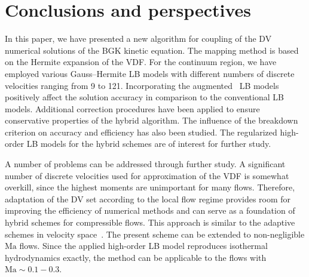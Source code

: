 \documentclass{elsarticle} %
\newcommand{\Ma}{\mathrm{Ma}}
\begin{document}
\begin{comment}%

\begin{figure}
    \centering
    \texttt{[image: \_pois\_hybr\_kn01\_cropped]}
    \caption{
        The normalized longitudinal velocity in the linear force-driven Poiseuille flow between parallel plates for $k=0.1$.
        The position of the coupling interface are shown by the vertical dashed lines.
    }\label{fig:poiseuille}
\end{figure}

In addition, the linear Poiseuille-flow problem is solved numerically.
The hybrid solution is compared with the DV and LB ones in Fig.~\ref{fig:poiseuille},
where the D2Q9-regularized LB model is employed~\cite{Latt2006, Mont2015}.
The hybrid solution based on the D2Q9-regularized model is very close to the DV results,
while the D2Q9-regularized model is failed to capture the Knudsen-layer part of the solution.
It is clearly seen from Fig.~\ref{fig:poiseuille} that the application of the regularized LB models in the hybrid scheme
can positively affect the solution accuracy in comparison to the conventional LB models.

\end{comment}

\section{Conclusions and perspectives}\label{sec:summary}

In this paper, we have presented a new algorithm for coupling of the DV numerical solutions of the BGK kinetic equation.
The mapping method is based on the Hermite expansion of the VDF.
For the continuum region, we have employed various Gauss--Hermite LB models with different numbers of discrete velocities ranging from 9 to 121.
Incorporating the augmented~\cite{Feuchter2016} LB models %
positively affect the solution accuracy in comparison to the conventional LB models.
Additional correction procedures have been applied to ensure conservative properties of the hybrid algorithm.
The influence of the breakdown criterion on accuracy and efficiency has also been studied.
The regularized high-order LB models for the hybrid schemes are of interest for further study.

A number of problems can be addressed through further study.
A significant number of discrete velocities used for approximation of the VDF is somewhat overkill,
since the highest moments are unimportant for many flows.
Therefore, adaptation of the DV set according to the local flow regime provides room for improving the efficiency of numerical methods
and can serve as a foundation of hybrid schemes for compressible flows.
This approach is similar to the adaptive schemes in velocity space~\cite{Aristov1977, Kolobov2013, Baranger2014}.
The present scheme can be extended to non-negligible $\Ma$ flows. Since the applied high-order LB model reproduces isothermal hydrodynamics exactly, the method can be applicable to the flows with $\Ma \sim 0.1-0.3$.
\end{document}
